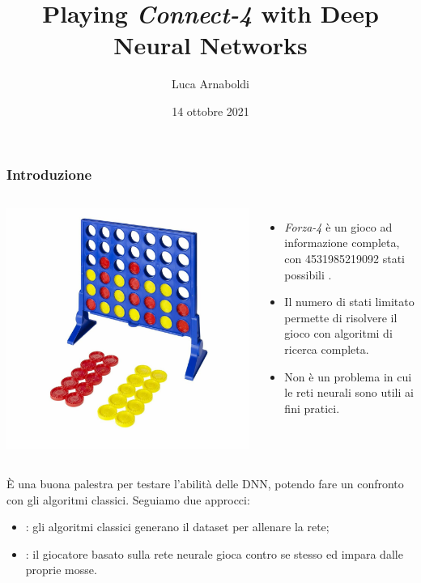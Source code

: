 \documentclass[handout]{beamer}
\title[Playing \emph{Connect-4} with DNN]{Playing \emph{Connect-4} with Deep Neural Networks}
\subtitle{}
\author[Luca Arnaboldi]{Luca Arnaboldi}
\institute[]{Corso ``Computing Methods for Experimental Physics and Data Analysis''}
\date[14-10-2021]{14 ottobre 2021}
\begin{document}
  
  \begin{frame}
    \frametitle{Introduzione}
    \begin{columns}
        \includegraphics[width=\textwidth]{img/connect4tablegame.jpg}
      
        \begin{itemize}
          \item \emph{Forza-4} è un gioco ad informazione completa, con \num{4531985219092} stati possibili \cite{oeis}. 
          \item Il numero di stati limitato permette di risolvere il gioco con algoritmi di ricerca completa.
          \item Non è un problema in cui le reti neurali sono utili ai fini pratici.
        \end{itemize}      
    \end{columns}
    \pause
    È una buona palestra per testare l'abilità delle DNN, potendo fare un confronto con gli algoritmi classici. Seguiamo due approcci:
    \begin{itemize}
      \item {}: gli algoritmi classici generano il dataset per allenare la rete;
      \item {}: il giocatore basato sulla rete neurale gioca contro se stesso ed impara dalle proprie mosse. 
    \end{itemize}
  \end{frame}
\end{document}
